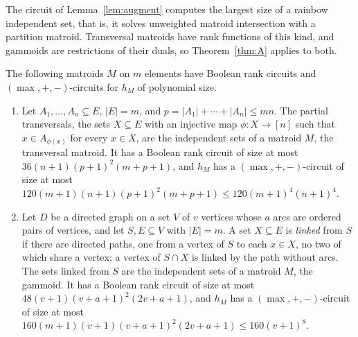 The circuit of Lemma~\ref{lem:augment} computes the largest size of a rainbow
independent set, that is, it solves unweighted matroid intersection with a
partition matroid.  Transversal matroids have rank functions of this kind, and
gammoids are restrictions of their duals, so Theorem~\ref{thm:A} applies to
both.

\begin{corollary}
\label{cor:transversal}
The following matroids $M$ on $m$ elements have Boolean rank circuits and $(\max,+,-)$-circuits for $h_M$ of polynomial size.
\begin{enumerate}
  \item Let $A_1,\ldots,A_n\subseteq E$, $|E|=m$, and $p=|A_1|+\cdots+|A_n|\le mn$.
        The partial transversals, the sets $X\subseteq E$ with an injective map
        $\phi:X\to[n]$ such that $x\in A_{\phi(x)}$ for every $x\in X$, are the
        independent sets of a matroid $M$, the transversal matroid.  It has a
        Boolean rank circuit of size at most $36(n+1)(p+1)^{2}(m+p+1)$, and $h_M$
        has a $(\max,+,-)$-circuit of size at most
        $120(m+1)(n+1)(p+1)^{2}(m+p+1)\le120(m+1)^{4}(n+1)^{4}$.
  \item Let $D$ be a directed graph on a set $V$ of $v$ vertices whose $a$ arcs are
        ordered pairs of vertices, and let $S,E\subseteq V$ with $|E|=m$.  A set
        $X\subseteq E$ is \emph{linked} from $S$ if there are directed paths, one
        from a vertex of $S$ to each $x\in X$, no two of which share a vertex; a
        vertex of $S\cap X$ is linked by the path without arcs.  The sets linked
        from $S$ are the independent sets of a matroid $M$, the gammoid.  It has a
        Boolean rank circuit of size at most $48(v+1)(v+a+1)^{2}(2v+a+1)$, and
        $h_M$ has a $(\max,+,-)$-circuit of size at most
        $160(m+1)(v+1)(v+a+1)^{2}(2v+a+1)\le160(v+1)^{8}$.
\end{enumerate}
\end{corollary}


